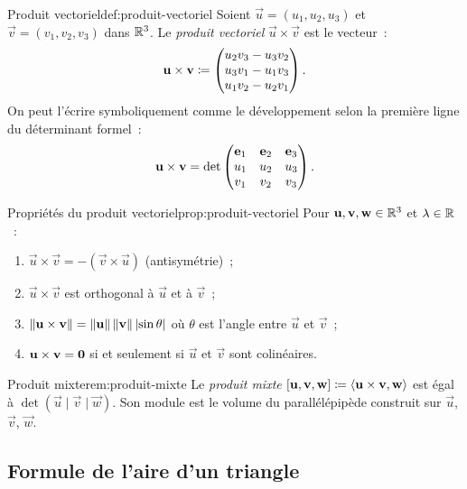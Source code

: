 \begin{definition}{Produit vectoriel}{def:produit-vectoriel}
  Soient $\vec{u}=(u_1,u_2,u_3)$ et $\vec{v}=(v_1,v_2,v_3)$ dans
  $\R^3$. Le \emph{produit vectoriel}
  $\vec{u}\times\vec{v}$ est le vecteur~:
  \[
    \vec{u}\times\vec{v}\deff\begin{pmatrix}
    u_2 v_3-u_3 v_2\\u_3 v_1-u_1 v_3\\u_1 v_2-u_2 v_1
    \end{pmatrix}.
  \]
  On peut l'écrire symboliquement comme le développement selon la
  première ligne du déterminant formel~:
  \[
    \vec{u}\times\vec{v}=\det\begin{pmatrix}
    \vece{1}&\vece{2}&\vece{3}\\u_1&u_2&u_3\\v_1&v_2&v_3
    \end{pmatrix}.
  \]
\end{definition}

\begin{proposition}{Propriétés du produit vectoriel}{prop:produit-vectoriel}
  Pour $\vec{u},\vec{v},\vec{w}\in\R^3$ et $\lambda\in\R$~:
  \begin{enumerate}[label=(\roman*)]
    \item $\vec{u}\times\vec{v}=-(\vec{v}\times\vec{u})$
      (antisymétrie)~;
    \item $\vec{u}\times\vec{v}$ est orthogonal à $\vec{u}$ et à
      $\vec{v}$~;
    \item $\norm{\vec{u}\times\vec{v}}=\norm{\vec{u}}\,\norm{\vec{v}}\,
      \abs{\sin\theta}$ où $\theta$ est l'angle entre $\vec{u}$ et
      $\vec{v}$~;
    \item $\vec{u}\times\vec{v}=\vzero$ si et seulement si $\vec{u}$ et
      $\vec{v}$ sont colinéaires.
  \end{enumerate}
\end{proposition}

\begin{remark}{Produit mixte}{rem:produit-mixte}
  Le \emph{produit mixte}
  $[\vec{u},\vec{v},\vec{w}]\deff\inner*{\vec{u}\times\vec{v},\vec{w}}$
  est égal à $\det(\vec{u}\mid\vec{v}\mid\vec{w})$. Son module est le
  volume du parallélépipède construit sur $\vec{u}$, $\vec{v}$,
  $\vec{w}$.
\end{remark}

\subsection{Formule de l'aire d'un triangle}\label{subsec:aire-triangle}


